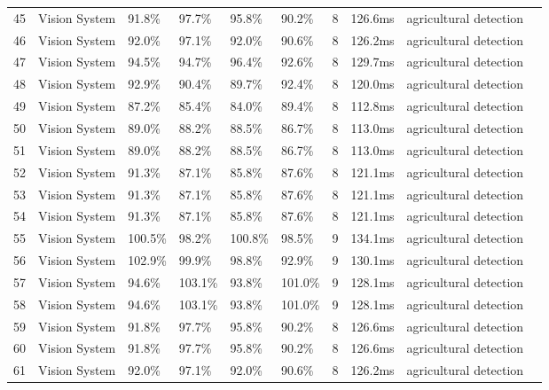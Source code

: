 \begin{table*}[htbp]
\begin{tabular}{p{}p{}p{}p{}p{}p{}p{}p{}p{}p{}}
 45 & Vision System & 91.8\% & 97.7\% & 95.8\% & 90.2\% & 8 & 126.6ms & agricultural detection & \cite{Wang2019} \\
 46 & Vision System & 92.0\% & 97.1\% & 92.0\% & 90.6\% & 8 & 126.2ms & agricultural detection & \cite{Kim2018} \\
 47 & Vision System & 94.5\% & 94.7\% & 96.4\% & 92.6\% & 8 & 129.7ms & agricultural detection & \cite{Li2017} \\
 48 & Vision System & 92.9\% & 90.4\% & 89.7\% & 92.4\% & 8 & 120.0ms & agricultural detection & \cite{Chen2016} \\
 49 & Vision System & 87.2\% & 85.4\% & 84.0\% & 89.4\% & 8 & 112.8ms & agricultural detection & \cite{Zhang2015} \\
 50 & Vision System & 89.0\% & 88.2\% & 88.5\% & 86.7\% & 8 & 113.0ms & agricultural detection & \cite{Yeo2014} \\
 51 & Vision System & 89.0\% & 88.2\% & 88.5\% & 86.7\% & 8 & 113.0ms & agricultural detection & \cite{Wang2014} \\
 52 & Vision System & 91.3\% & 87.1\% & 85.8\% & 87.6\% & 8 & 121.1ms & agricultural detection & \cite{Kim2013} \\
 53 & Vision System & 91.3\% & 87.1\% & 85.8\% & 87.6\% & 8 & 121.1ms & agricultural detection & \cite{Li2013} \\
 54 & Vision System & 91.3\% & 87.1\% & 85.8\% & 87.6\% & 8 & 121.1ms & agricultural detection & \cite{Chen2013} \\
 55 & Vision System & 100.5\% & 98.2\% & 100.8\% & 98.5\% & 9 & 134.1ms & agricultural detection & \cite{Yang2022} \\
 56 & Vision System & 102.9\% & 99.9\% & 98.8\% & 92.9\% & 9 & 130.1ms & agricultural detection & \cite{Zhang2021} \\
 57 & Vision System & 94.6\% & 103.1\% & 93.8\% & 101.0\% & 9 & 128.1ms & agricultural detection & \cite{Kim2020} \\
 58 & Vision System & 94.6\% & 103.1\% & 93.8\% & 101.0\% & 9 & 128.1ms & agricultural detection & \cite{Wang2020} \\
 59 & Vision System & 91.8\% & 97.7\% & 95.8\% & 90.2\% & 8 & 126.6ms & agricultural detection & \cite{Li2019} \\
 60 & Vision System & 91.8\% & 97.7\% & 95.8\% & 90.2\% & 8 & 126.6ms & agricultural detection & \cite{Chen2019} \\
 61 & Vision System & 92.0\% & 97.1\% & 92.0\% & 90.6\% & 8 & 126.2ms & agricultural detection & \cite{Yeo2018} \\

\end{tabular}
\end{table*}
